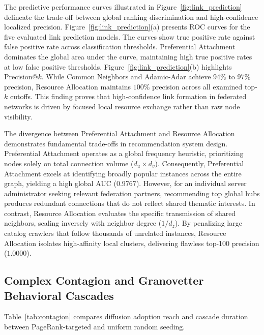 \documentclass[conference]{IEEEtran}
\begin{document}
The predictive performance curves illustrated in Figure~\ref{fig:link_prediction} delineate the trade-off between global ranking discrimination and high-confidence localized precision. Figure~\ref{fig:link_prediction}(a) presents ROC curves for the five evaluated link prediction models. The curves show true positive rate against false positive rate across classification thresholds. Preferential Attachment dominates the global area under the curve, maintaining high true positive rates at low false positive thresholds. Figure~\ref{fig:link_prediction}(b) highlights Precision@$k$. While Common Neighbors and Adamic-Adar achieve $94\%$ to $97\%$ precision, Resource Allocation maintains $100\%$ precision across all examined top-$k$ cutoffs. This finding proves that high-confidence link formation in federated networks is driven by focused local resource exchange rather than raw node visibility.


The divergence between Preferential Attachment and Resource Allocation demonstrates fundamental trade-offs in recommendation system design. Preferential Attachment operates as a global frequency heuristic, prioritizing nodes solely on total connection volume ($d_u \times d_v$). Consequently, Preferential Attachment excels at identifying broadly popular instances across the entire graph, yielding a high global AUC ($0.9767$). However, for an individual server administrator seeking relevant federation partners, recommending top global hubs produces redundant connections that do not reflect shared thematic interests. In contrast, Resource Allocation evaluates the specific transmission of shared neighbors, scaling inversely with neighbor degree ($1/d_z$). By penalizing large catalog crawlers that follow thousands of unrelated instances, Resource Allocation isolates high-affinity local clusters, delivering flawless top-100 precision ($1.0000$).


\subsection{Complex Contagion and Granovetter Behavioral Cascades}

Table~\ref{tab:contagion} compares diffusion adoption reach and cascade duration between PageRank-targeted and uniform random seeding.
\end{document}
